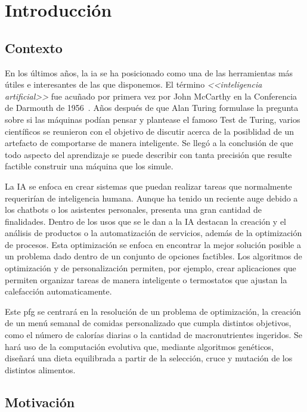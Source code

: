 \chapter{Introducción}
\label{ch:introduccion}

\section{Contexto}
En los últimos años, la \gls{ia} se ha posicionado como una de las herramientas más útiles e interesantes de las que disponemos. El término \textit{<<inteligencia artificial>>} fue acuñado por primera vez por John McCarthy en la Conferencia de Darmouth de 1956~\cite{dartmouth1956}. Años después de que Alan Turing formulase la pregunta sobre si las máquinas podían pensar y plantease el famoso Test de Turing, varios científicos se reunieron con el objetivo de discutir acerca de la posiblidad de un artefacto de comportarse de manera inteligente. Se llegó a la conclusión de que todo aspecto del aprendizaje se puede describir con tanta precisión que resulte factible construir una máquina que los simule.

La IA se enfoca en crear sistemas que puedan realizar tareas que normalmente requerirían de inteligencia humana. Aunque ha tenido un reciente auge debido a los chatbots o los asistentes personales, presenta una gran cantidad de finalidades. Dentro de los usos que se le dan a la IA destacan la creación y el análisis de productos o la automatización de servicios, además de la optimización de procesos. Esta optimización se enfoca en encontrar la mejor solución posible a un problema dado dentro de un conjunto de opciones factibles. Los algoritmos de optimización y de personalización permiten, por ejemplo, crear aplicaciones que permiten organizar tareas de manera inteligente o termostatos que ajustan la calefacción automaticamente.

Este \gls{pfg} se centrará en la resolución de un problema de optimización, la creación de un menú semanal de comidas personalizado que cumpla distintos objetivos, como el número de calorías diarias o la cantidad de macronutrientes ingeridos. Se hará uso de la computación evolutiva que, mediante algoritmos genéticos, diseñará una dieta equilibrada a partir de la selección, cruce y mutación de los distintos alimentos.


\section{Motivación}

